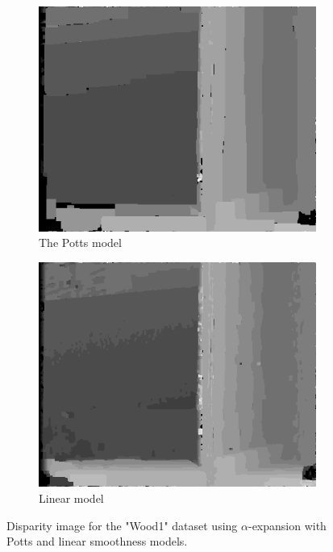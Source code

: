 \documentclass[letterpaper, 10 pt, conference]{ieeeconf}  %
\begin{document}
\begin{figure}
        \centering
        \begin{subfigure}[b]{0.3\textwidth}
                \centering
                \includegraphics[width=\textwidth]{imgs/l2disparity-expansion-potts.png}
                \caption{The Potts model}
                \label{fig:trees}
        \end{subfigure}%
        
        \begin{subfigure}[b]{0.3\textwidth}
                \centering
                \includegraphics[width=\textwidth]{imgs/l2disparity-expansion-linear.png}
                \caption{Linear model}
                \label{fig:farm}
        \end{subfigure}
        \caption{Disparity image for the "Wood1" dataset using $\alpha$-expansion with Potts and linear smoothness models.}
        \label{models}
\end{figure}
\end{document}
